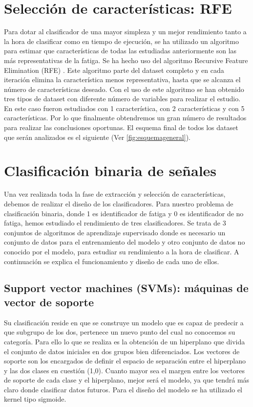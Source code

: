 \section{Selección de características: RFE}
Para dotar al clasificador de una mayor simpleza y un mejor rendimiento tanto a la hora de clasificar como en tiempo de ejecución, se ha utilizado un algoritmo para estimar que características de todas las estudiadas anteriormente son las más representativas de la fatiga. Se ha hecho uso del algoritmo Recursive Feature Elimination (RFE) \cite{ramos2018emg}. Este algoritmo parte del dataset completo y en cada iteración elimina la característica menos representativa, hasta que se alcanza el número de características deseado. Con el uso de este algoritmo se han obtenido tres tipos de dataset con diferente número de variables para realizar el estudio. En este caso fueron estudiados con 1 característica, con 2 características y con 5 características. Por lo que finalmente obtendremos un gran número de resultados para realizar las conclusiones oportunas. El esquema final de todos los dataset que serán analizados es el siguiente (Ver \ref{fig:esquemageneral}).


\section{Clasificación binaria de señales}
Una vez realizada toda la fase de extracción y selección de características, debemos de realizar el diseño de los clasificadores. Para nuestro problema de clasificación binaria, donde 1 es identificador de fatiga y 0 es identificador de no fatiga, hemos estudiado el rendimiento de tres clasificadores. Se trata de 3 conjuntos de algoritmos de aprendizaje supervisado donde es necesario un conjunto de datos para el entrenamiento del modelo y otro conjunto de datos no conocido por el modelo, para estudiar su rendimiento a la hora de clasificar. A continuación se explica el funcionamiento y diseño de cada uno de ellos.
    \newpage
    \subsection{Support vector machines (SVMs): máquinas de vector de soporte}
    Su clasificación reside en que se construye un modelo que es capaz de predecir a que subgrupo de los dos, pertenece un nuevo punto del cual no conocemos su categoría.
    Para ello lo que se realiza es la obtención de un hiperplano que divida el conjunto de datos iniciales en dos grupos bien diferenciados. Los vectores de soporte son los encargados de definir el espacio de separación entre el hiperplano y las dos clases en cuestión (1,0). Cuanto mayor sea el margen entre los vectores de soporte de cada clase y el hiperplano, mejor será el modelo, ya que tendrá más claro donde clasificar datos futuros. Para el diseño del modelo se ha utilizado el kernel tipo sigmoide.
    
